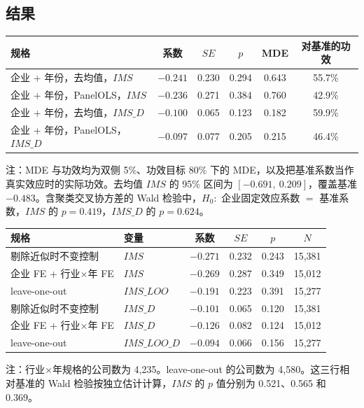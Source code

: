 \documentclass[11pt]{article}
\begin{document}
\subsection{结果}

\begin{center}
\begin{threeparttable}
\caption{功效与``等于基准''的检验（全部控制）}
\label{tab:power}
\begin{tabular}{lccccc}
\toprule
规格 & 系数 & \(SE\) & \(p\) & MDE & 对基准的功效 \\
\midrule
企业 + 年份，去均值，\(IMS\) & \(-0.241\) & 0.230 & 0.294 & 0.643 & 55.7\% \\
企业 + 年份，PanelOLS，\(IMS\) & \(-0.236\) & 0.271 & 0.384 & 0.760 & 42.9\% \\
企业 + 年份，去均值，\(IMS\_D\) & \(-0.100\) & 0.065 & 0.123 & 0.182 & 59.9\% \\
企业 + 年份，PanelOLS，\(IMS\_D\) & \(-0.097\) & 0.077 & 0.205 & 0.215 & 46.4\% \\
\bottomrule
\end{tabular}
\begin{tablenotes}\footnotesize
\item 注：MDE 与功效均为双侧 5\%、功效目标 80\% 下的 MDE，以及把基准系数当作真实效应时的实际功效。去均值 \(IMS\) 的 95\% 区间为 \([-0.691,\ 0.209]\)，覆盖基准 \(-0.483\)。含聚类交叉协方差的 Wald 检验中，\(H_0:\) 企业固定效应系数 \(=\) 基准系数，\(IMS\) 的 \(p=0.419\)，\(IMS\_D\) 的 \(p=0.624\)。
\end{tablenotes}
\end{threeparttable}
\end{center}

\begin{center}
\begin{threeparttable}
\caption{事先规定的规格扩展}
\label{tab:ext}
\begin{tabular}{llcccc}
\toprule
规格 & 变量 & 系数 & \(SE\) & \(p\) & \(N\) \\
\midrule
剔除近似时不变控制 & \(IMS\) & \(-0.271\) & 0.232 & 0.243 & 15,381 \\
企业 FE + 行业\(\times\)年 FE & \(IMS\) & \(-0.269\) & 0.287 & 0.349 & 15,012 \\
leave-one-out & \(IMS\_LOO\) & \(-0.191\) & 0.223 & 0.391 & 15,277 \\
剔除近似时不变控制 & \(IMS\_D\) & \(-0.101\) & 0.065 & 0.120 & 15,381 \\
企业 FE + 行业\(\times\)年 FE & \(IMS\_D\) & \(-0.126\) & 0.082 & 0.124 & 15,012 \\
leave-one-out & \(IMS\_LOO\_D\) & \(-0.094\) & 0.066 & 0.156 & 15,277 \\
\bottomrule
\end{tabular}
\begin{tablenotes}\footnotesize
\item 注：行业\(\times\)年规格的公司数为 4,235。leave-one-out 的公司数为 4,580。这三行相对基准的 Wald 检验按独立估计计算，\(IMS\) 的 \(p\) 值分别为 0.521、0.565 和 0.369。
\end{tablenotes}
\end{threeparttable}
\end{center}
\end{document}
